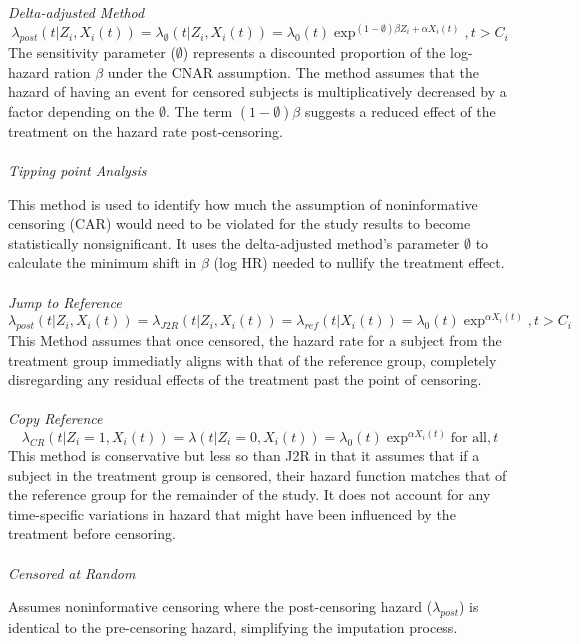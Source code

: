 \\\\
\textit{Delta-adjusted Method}
\begin{equation} \label{eq:deltaadjust}\lambda_{post}(t|Z_{i},X_{i}(t)) = \lambda_{\emptyset}(t|Z_{i},X_{i}(t)) = \lambda_{0}(t)\exp^{(1-\emptyset)\beta Z_{i} + \alpha X_{i}(t)}, t>C_{i}\end{equation}
\noindent The sensitivity parameter (\(\emptyset\)) represents a discounted proportion of the log-hazard ration \(\beta\) under the CNAR assumption. The method assumes that the hazard of having an event for censored subjects is multiplicatively decreased by a factor depending on the \(\emptyset\). The term \((1- \emptyset)\beta\) suggests a reduced effect of the treatment on the hazard rate post-censoring.
\\\\
\textit{Tipping point Analysis}
\par \noindent This method is used to identify how much the assumption of noninformative censoring (CAR) would need to be violated for the study results to become statistically nonsignificant. It uses the delta-adjusted method's parameter \(\emptyset\) to calculate the minimum shift in \(\beta\) (log HR) needed to nullify the treatment effect.
\\\\
\textit{Jump to Reference}
\begin{equation} \label{eq:jtor}\lambda_{post}(t|Z_{i},X_{i}(t)) = \lambda_{J2R}(t|Z_{i},X_{i}(t)) = \lambda_{ref}(t|X_{i}(t)) = \lambda_{0}(t)\exp^{\alpha X_{i}(t)}, t>C_{i}\end{equation}
\noindent This Method assumes that once censored, the hazard rate for a subject from the treatment group immediatly aligns with that of the reference group, completely disregarding any residual effects of the treatment past the point of censoring.
\\\\
\textit{Copy Reference}
\begin{equation} \label{eq:copyref}\lambda_{CR}(t|Z_{i} = 1,X_{i}(t)) = \lambda(t|Z_{i} = 0, X_{i}(t)) = \lambda_{0}(t)\exp^{\alpha X_{i}(t)} \text{for all}, t\end{equation}
\noindent This method is conservative but less so than J2R in that it assumes that if a subject in the treatment group is censored, their hazard function matches that of the reference group for the remainder of the study. It does not account for any time-specific variations in hazard that might have been influenced by the treatment before censoring.
\\\\
\textit{Censored at Random}
\par \noindent Assumes noninformative censoring where the post-censoring hazard (\(\lambda_{post}\)) is identical to the pre-censoring hazard, simplifying the imputation process.

